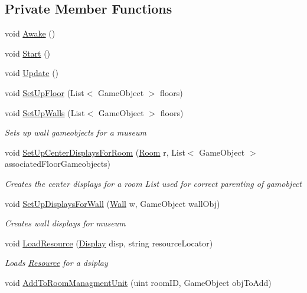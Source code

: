 \subsection*{Private Member Functions}
\begin{DoxyCompactItemize}
\item 
void \mbox{\hyperlink{class_museum_builder_a846546ea2e9bf91bba2a166dc2b01e2d}{Awake}} ()
\item 
void \mbox{\hyperlink{class_museum_builder_a33c69af71baa8a6033be9d2fc04ef5f8}{Start}} ()
\item 
void \mbox{\hyperlink{class_museum_builder_a6f66f859260dac43de5248e3c4a0b25c}{Update}} ()
\item 
void \mbox{\hyperlink{class_museum_builder_a7a68d64f1f418c4cdf43afc48ffa07b1}{Set\+Up\+Floor}} (List$<$ Game\+Object $>$ floors)
\item 
void \mbox{\hyperlink{class_museum_builder_a52350d2e48a73d0e5400e2d8d31a8913}{Set\+Up\+Walls}} (List$<$ Game\+Object $>$ floors)
\begin{DoxyCompactList}\small\item\em Sets up wall gameobjects for a museum \end{DoxyCompactList}\item 
void \mbox{\hyperlink{class_museum_builder_a159e037415aaf348d5a0af9561be8560}{Set\+Up\+Center\+Displays\+For\+Room}} (\mbox{\hyperlink{class_room}{Room}} r, List$<$ Game\+Object $>$ associated\+Floor\+Gameobjects)
\begin{DoxyCompactList}\small\item\em Creates the center displays for a room List used for correct parenting of gamobject \end{DoxyCompactList}\item 
void \mbox{\hyperlink{class_museum_builder_adbfb12c00a855fe0f816bc18a51a72e5}{Set\+Up\+Displays\+For\+Wall}} (\mbox{\hyperlink{class_wall}{Wall}} w, Game\+Object wall\+Obj)
\begin{DoxyCompactList}\small\item\em Creates wall displays for museum \end{DoxyCompactList}\item 
void \mbox{\hyperlink{class_museum_builder_a2c456481ed3350f0113041111d63d0ec}{Load\+Resource}} (\mbox{\hyperlink{class_display}{Display}} disp, string resource\+Locator)
\begin{DoxyCompactList}\small\item\em Loads \mbox{\hyperlink{class_resource}{Resource}} for a dsiplay \end{DoxyCompactList}\item 
void \mbox{\hyperlink{class_museum_builder_ad1991ecd1258a2eb6d020d3c429ad9c8}{Add\+To\+Room\+Managment\+Unit}} (uint room\+ID, Game\+Object obj\+To\+Add)
\end{DoxyCompactItemize}
